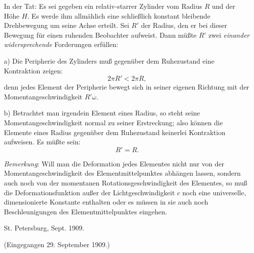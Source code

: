 \documentclass[12pt,a4paper]{article}
\begin{document}
In der Tat: Es sei gegeben ein relativ-starrer Zylinder vom Radius $R$ und der Höhe $H$. Es werde ihm allmählich eine schließlich konstant bleibende Drehbewegung um seine Achse erteilt. Sei $R'$ der Radius, den er bei dieser Bewegung für einen ruhenden Beobachter aufweist. Dann müßte $R'$ zwei \emph{einander widersprechende} Forderungen erfüllen:

a) Die Peripherie des Zylinders muß gegenüber dem Ruhezustand eine Kontraktion zeigen:
\[ 2\pi R'<2\pi R, \]
denn jedes Element der Peripherie bewegt sich in seiner eigenen Richtung mit der Momentangeschwindigkeit $R'\omega$.

b) Betrachtet man irgendein Element eines Radius, so steht seine Momentangeschwindigkeit normal zu seiner Erstreckung; also können die Elemente eines Radius gegenüber dem Ruhezustand keinerlei Kontraktion aufweisen. Es müßte sein:
\[ R'=R. \]

\emph{Bemerkung}: Will man die Deformation jedes Elementes nicht nur von der Momentangeschwindigkeit des Elementmittelpunktes abhängen lassen, sondern auch noch von der momentanen Rotationsgeschwindigkeit des Elementes, so muß die Deformationsfunktion außer der Lichtgeschwindigkeit $c$ noch eine universelle, dimensionierte Konstante enthalten oder es müssen in sie auch noch Beschleunigungen des Elementmittelpunktes eingehen.

St. Petersburg, Sept. 1909.

\begin{flushright}\small (Eingegangen 29. September 1909.)\end{flushright}
\end{document}
